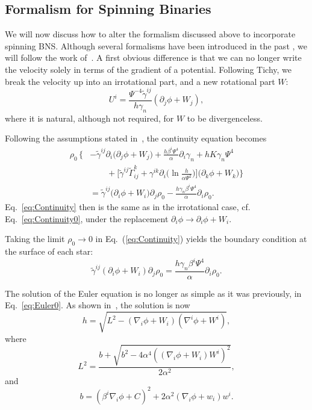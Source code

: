 \subsection{Formalism for Spinning Binaries}
We will now discuss how to alter the formalism discussed above to
incorporate spinning BNS. Although several formalisms have been
introduced in the past \citep{Marronetti:2003gk,Baumgarte:2009fw}, we will
follow the work of~\cite{Tichy:2011gw}. A
first obvious difference is that we can no longer write the velocity
solely in terms of the gradient of a potential. Following Tichy, we
break the velocity up into an irrotational part, and a new rotational
part $W$:
\begin{equation}
U^i =
\frac{\Psi^{-4}\tilde{\gamma}^{ij}}{h\gamma_n}\left(\partial_j\phi+W_j\right),
\end{equation}
where it is natural, although not required, for $W$ to be
  divergenceless.

Following the assumptions stated in~\cite{Tichy:2011gw}, the continuity equation becomes
\begin{align}
\rho_0\,\bigg\{\!\!&-\tilde{\gamma}^{ij}\partial_i\big(\partial_j\phi+W_j\big)  + \frac{h\beta^i\Psi^4}{\alpha}\partial_i\gamma_n + hK\gamma_n\Psi^4 \nonumber\\
&\qquad+\Big[\tilde{\gamma}^{ij}\tilde{\Gamma}^k_{ij}+\gamma^{ik}\partial_i\big(\ln \frac{h}{\alpha\Psi^2}\big)\Big] 
\big(\partial_k\phi+W_k\big) \bigg\} \nonumber \\
&=\tilde{\gamma}^{ij}\big(\partial_i\phi+W_i\big)\partial_j\rho_0 - \frac{h\gamma_n\beta^i\Psi^4}{\alpha}\partial_i\rho_0.
\label{eq:Continuity}
\end{align}
Eq.~\ref{eq:Continuity} then is the same as in the irrotational
case, cf. Eq.~\ref{eq:Continuity0}, under the replacement $\partial_i\phi\rightarrow\partial_i\phi+W_i$.

Taking the limit $\rho_0\to 0$ in Eq.~(\ref{eq:Continuity}) yields the
boundary condition at the surface of each star:
\begin{equation}
\tilde{\gamma}^{ij}\left(\partial_i\phi+W_i\right)\partial_j\rho_0=\frac{h\gamma_n\beta^i\Psi^4}{\alpha}\partial_i\rho_0.
\end{equation}

The solution of the Euler equation is no longer as simple as it was
previously, in Eq.~\ref{eq:Euler0}. As
shown in~\cite{Tichy:2011gw}, the solution is
now
\begin{equation}
h = \sqrt{L^2 -
  \left(\nabla_i\phi+W_i\right)\left(\nabla^i\phi+W^i\right)},
\end{equation}
where
\begin{equation}
L^2 =
\frac{b+\sqrt{b^2-4\alpha^4\left(\left(\nabla_i\phi+W_i\right)W^i\right)^2}}{2\alpha^2},
\end{equation}
and
\begin{equation}
b =
\left(\beta^i\nabla_i\phi+C\right)^2+2\alpha^2\left(\nabla_i\phi+w_i\right)w^i.
\end{equation}


